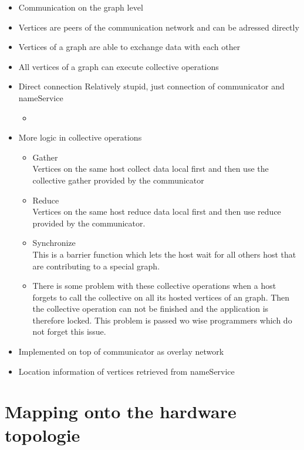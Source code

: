 \begin{itemize}
\item Communication on the graph level
\item Vertices are peers of the communication network and can be adressed directly
\item Vertices of a graph are able to exchange data with each other
\item All vertices of a graph can execute collective operations

\item Direct connection Relatively stupid, just connection of communicator and nameService
\begin{itemize}
\item 
\end{itemize}

\item More logic in collective operations
  \begin{itemize}
    \item Gather\\
      Vertices on the same host collect data local first and then use
      the collective gather provided by the communicator
    \item Reduce\\
      Vertices on the same host reduce data local first and then use
      reduce provided by the communicator.
    \item Synchronize\\
      This is a barrier function which lets the host wait for all others host
      that are contributing to a special graph. 
    \item There is some problem with these collective operations when a host
      forgets to call the collective on all its hosted vertices of an graph.
      Then the collective operation can not be finished and the application 
      is therefore locked. This problem is passed wo wise programmers which
      do not forget this issue.
  \end{itemize}
  

\item Implemented on top of communicator as overlay network
\item Location information of vertices retrieved from nameService


\end{itemize}

\section{Mapping onto the hardware topologie}

